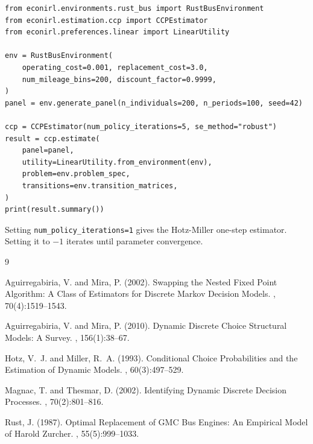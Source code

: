 \documentclass[11pt]{article}
\begin{document}
\begin{verbatim}
from econirl.environments.rust_bus import RustBusEnvironment
from econirl.estimation.ccp import CCPEstimator
from econirl.preferences.linear import LinearUtility

env = RustBusEnvironment(
    operating_cost=0.001, replacement_cost=3.0,
    num_mileage_bins=200, discount_factor=0.9999,
)
panel = env.generate_panel(n_individuals=200, n_periods=100, seed=42)

ccp = CCPEstimator(num_policy_iterations=5, se_method="robust")
result = ccp.estimate(
    panel=panel,
    utility=LinearUtility.from_environment(env),
    problem=env.problem_spec,
    transitions=env.transition_matrices,
)
print(result.summary())
\end{verbatim}

Setting \texttt{num\_policy\_iterations=1} gives the Hotz-Miller one-step estimator. Setting it to $-1$ iterates until parameter convergence.



\begin{thebibliography}{9}

Aguirregabiria, V. and Mira, P. (2002).
\newblock Swapping the Nested Fixed Point Algorithm: A Class of Estimators for Discrete {Markov} Decision Models.
, 70(4):1519--1543.

Aguirregabiria, V. and Mira, P. (2010).
\newblock Dynamic Discrete Choice Structural Models: A Survey.
, 156(1):38--67.

Hotz, V.~J. and Miller, R.~A. (1993).
\newblock Conditional Choice Probabilities and the Estimation of Dynamic Models.
, 60(3):497--529.

Magnac, T. and Thesmar, D. (2002).
\newblock Identifying Dynamic Discrete Decision Processes.
, 70(2):801--816.

Rust, J. (1987).
\newblock Optimal Replacement of {GMC} Bus Engines: An Empirical Model of {Harold Zurcher}.
, 55(5):999--1033.

\end{thebibliography}
\end{document}
